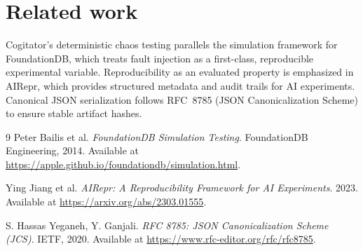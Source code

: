 \section{Related work}
\label{sec:related}

Cogitator's deterministic chaos testing parallels the simulation framework for
FoundationDB, which treats fault injection as a first-class, reproducible experimental
variable. Reproducibility as an evaluated property is emphasized in AIRepr, which
provides structured metadata and audit trails for AI experiments. Canonical JSON
serialization follows RFC~8785 (JSON Canonicalization Scheme) to ensure stable artifact
hashes.

\begin{thebibliography}{9}
Peter Bailis et al. \emph{FoundationDB Simulation Testing}. FoundationDB Engineering,
2014. Available at \url{https://apple.github.io/foundationdb/simulation.html}.

Ying Jiang et al. \emph{AIRepr: A Reproducibility Framework for AI Experiments}. 2023.
Available at \url{https://arxiv.org/abs/2303.01555}.

S. Hassas Yeganeh, Y. Ganjali. \emph{RFC 8785: JSON Canonicalization Scheme (JCS)}.
IETF, 2020. Available at \url{https://www.rfc-editor.org/rfc/rfc8785}.
\end{thebibliography}
